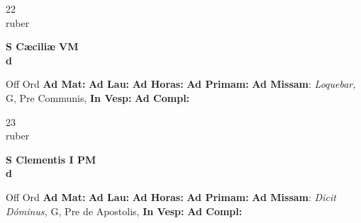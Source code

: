 \documentclass[10pt, openany]{book}
\begin{document}
    \begin{center}
        \begin{minipage}{3.5in}
            \vspace{2em}
            \begin{minipage}{0.5in}
                {\Huge 22} \\
                {\normalsize ruber}
            \end{minipage}
            \begin{minipage}{3.0in}
                \textbf{ \large S Cæciliæ VM \\
                \textnormal{\normalsize d}}

            \end{minipage}
            \begin{justify}Off Ord
                \textbf{Ad Mat: }
                \textbf{Ad Lau: }
                \textbf{Ad Horas: }
                \textbf{Ad Primam: }\textbf{Ad Missam}: \textit{Loquebar,} G, Pre Communis, 
                \textbf{In Vesp: }
                \textbf{Ad Compl: }
            \end{justify}
        \end{minipage}
    \end{center}

    \begin{center}
        \begin{minipage}{3.5in}
            \vspace{2em}
            \begin{minipage}{0.5in}
                {\Huge 23} \\
                {\normalsize ruber}
            \end{minipage}
            \begin{minipage}{3.0in}
                \textbf{ \large S Clementis I PM \\
                \textnormal{\normalsize d}}

            \end{minipage}
            \begin{justify}Off Ord
                \textbf{Ad Mat: }
                \textbf{Ad Lau: }
                \textbf{Ad Horas: }
                \textbf{Ad Primam: }\textbf{Ad Missam}: \textit{Dicit Dóminus,} G, Pre de Apostolis, 
                \textbf{In Vesp: }
                \textbf{Ad Compl: }
            \end{justify}
        \end{minipage}
    \end{center}
\end{document}
